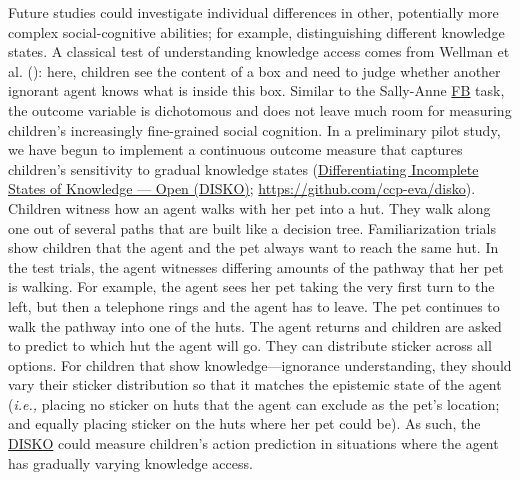 \documentclass[
]{scrbook}
\begin{document}
Future studies could investigate individual differences in other, potentially more complex social-cognitive abilities; for example, distinguishing different knowledge states. A classical test of understanding knowledge access comes from Wellman et al. (): here, children see the content of a box and need to judge whether another ignorant agent knows what is inside this box. Similar to the Sally-Anne \hyperref[acronyms_FB]{FB} task, the outcome variable is dichotomous and does not leave much room for measuring children's increasingly fine-grained social cognition. In a preliminary pilot study, we have begun to implement a continuous outcome measure that captures children's sensitivity to gradual knowledge states (\hyperref[acronyms_DISKO]{Differentiating Incomplete States of Knowledge --- Open (DISKO)}; \mbox{\url{https://github.com/ccp-eva/disko}}). Children witness how an agent walks with her pet into a hut. They walk along one out of several paths that are built like a decision tree. Familiarization trials show children that the agent and the pet always want to reach the same hut. In the test trials, the agent witnesses differing amounts of the pathway that her pet is walking. For example, the agent sees her pet taking the very first turn to the left, but then a telephone rings and the agent has to leave. The pet continues to walk the pathway into one of the huts. The agent returns and children are asked to predict to which hut the agent will go. They can distribute sticker across all options. For children that show knowledge---ignorance understanding, they should vary their sticker distribution so that it matches the epistemic state of the agent (\emph{i.e.,} placing no sticker on huts that the agent can exclude as the pet's location; and equally placing sticker on the huts where her pet could be). As such, the \hyperref[acronyms_DISKO]{DISKO} could measure children's action prediction in situations where the agent has gradually varying knowledge access.
\end{document}
